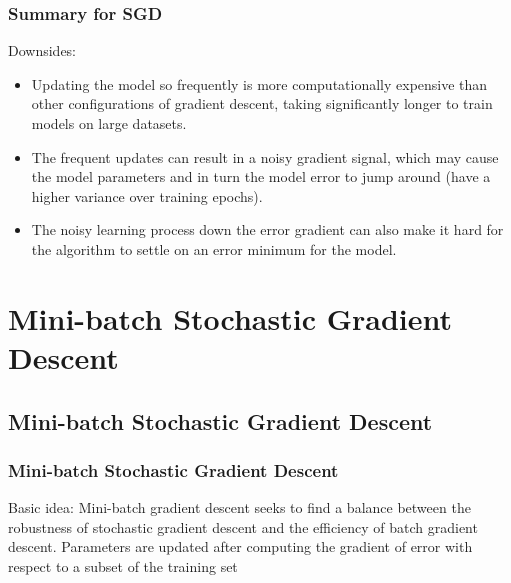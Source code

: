 \documentclass[cjk]{beamer}
\begin{document}
\begin{CJK*}{GBK}{kai}
\begin{frame}
\frametitle{Summary for SGD}
Downsides:
\begin{itemize}
	\item Updating the model so frequently is more computationally expensive than other configurations of gradient descent, taking significantly longer to train models on large datasets.
	\item The frequent updates can result in a noisy gradient signal, which may cause the model parameters and in turn the model error to jump around (have a higher variance over training epochs).
	\item The noisy learning process down the error gradient can also make it hard for the algorithm to settle on an error minimum for the model.
\end{itemize}
\end{frame}

\section{Mini-batch Stochastic Gradient Descent}

\subsection{Mini-batch Stochastic Gradient Descent}

\begin{frame}
\frametitle{Mini-batch Stochastic Gradient Descent}
	\begin{block}{Basic idea:}
	Mini-batch gradient descent seeks to find a balance between the robustness of stochastic gradient descent and the efficiency of batch gradient descent. Parameters are updated after computing the gradient of error with respect to a subset of the training set
	\end{block}
\end{frame}


\end{CJK*}
\end{document}
